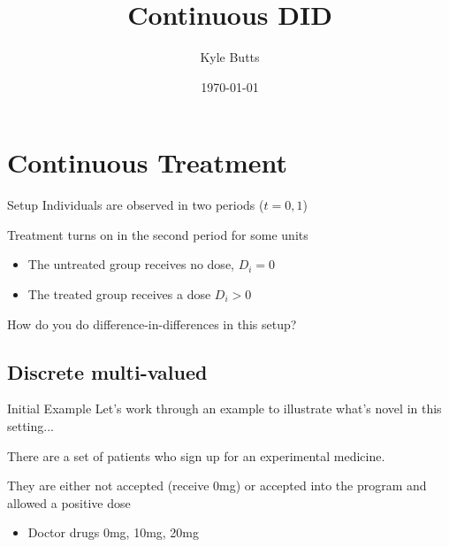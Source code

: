 \documentclass[aspectratio=169,t]{beamer}
\title{Continuous DID}
\date{\today}
\author{Kyle Butts}
\begin{document}
\begin{frame}
\maketitle

\end{frame}


\section{Continuous Treatment}

\begin{frame}{Setup}
  Individuals are observed in two periods ($t = 0, 1$)

  \bigskip
  Treatment turns on in the second period for some units
  \begin{itemize}
    \item The untreated group receives no dose, $D_i = 0$

    \item The treated group receives a dose $D_i > 0$
  \end{itemize}

  \bigskip
  How do you do difference-in-differences in this setup?
\end{frame}

%
%

\subsection{Discrete multi-valued}

\begin{frame}{Initial Example}
  Let's work through an example to illustrate what's novel in this setting...

  \bigskip
  There are a set of patients who sign up for an experimental medicine.

  They are either not accepted (receive 0mg) or accepted into the program and allowed a positive dose
  \begin{itemize}
    \item Doctor drugs 0mg, 10mg, 20mg
  \end{itemize}

\end{frame}
\end{document}
